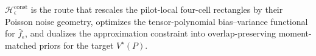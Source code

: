 \(\mathscr H_\epsilon^{\mathrm{const}}\) is the route that rescales the pilot-local four-cell rectangles by their Poisson noise geometry, optimizes the tensor-polynomial bias--variance functional for \(\bar f_\epsilon\), and dualizes the approximation constraint into overlap-preserving moment-matched priors for the target \(V^\star(P)\).